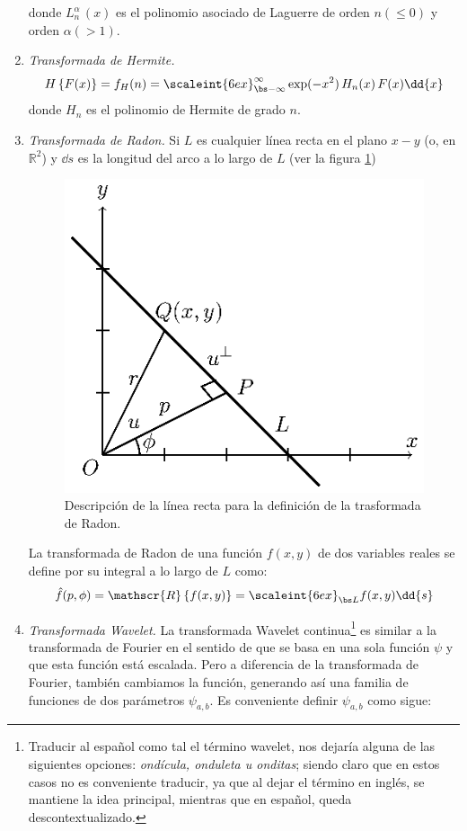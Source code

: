 \begin{enumerate}
donde $L_{n}^{\alpha} \, (x)$ es el polinomio asociado de Laguerre de orden $n (\leq 0)$ y orden $\alpha (> 1)$.
\item \emph{Transformada de Hermite.}
\begin{align}
H \left\{ F (x) \right\} = f_{H} (n) = \scaleint{6ex}_{\bs -\infty}^{\infty} \exp(-x^{2}) \, H_{n} (x) \, F (x) \dd{x}
\label{eq:ecuacion_17_2_1}
\end{align}
donde $H_{n}$ es el polinomio de Hermite de grado $n$.
\item \emph{Transformada de Radon.}
Si $L$ es cualquier línea recta en el plano $x-y$ (o, en $\mathbb{R}^{2}$) y $\dd{s}$ es la longitud del arco a lo largo de $L$ (ver la figura \ref{eq:figura_Radon})
\begin{figure}[H]
    \centering
    \includegraphics[scale=1.3]{Imagenes/Figura_Transformada_Radon.eps}
    \caption{Descripción de la línea recta para la definición de la trasformada de Radon.}
    \label{eq:figura_Radon}
\end{figure}
La transformada de Radon de una función $f (x, y)$ de dos variables reales se define por su integral a lo largo de $L$ como:
\begin{align}
\hat{f} (p, \phi) = \mathscr{R} \left\{ f(x, y) \right\} = \scaleint{6ex}_{\bs L} f (x, y) \dd{s}
\label{eq:ecuacion_18_2_1}
\end{align}
\item \emph{Transformada Wavelet.}
La transformada Wavelet continua\footnote{Traducir al español como tal el término wavelet, nos dejaría alguna de las siguientes opciones: \emph{ondícula, onduleta u onditas}; siendo claro que en estos casos no es conveniente traducir, ya que al dejar el término en inglés, se mantiene la idea principal, mientras que en español, queda descontextualizado.} es similar a la transformada de Fourier en el sentido de que se basa en una sola función $\psi$ y que esta función está escalada. Pero a diferencia de la transformada de Fourier, también cambiamos la función, generando así una familia de funciones de dos parámetros $\psi_{a, b}$. Es conveniente definir $\psi_{a, b}$ como sigue:

\end{enumerate}
